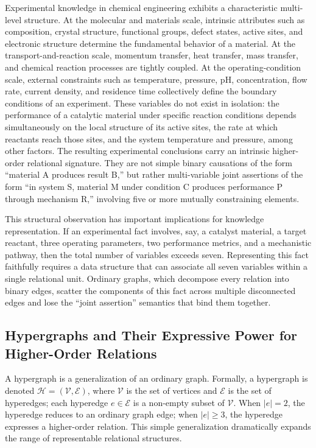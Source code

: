 \documentclass[11pt,a4paper]{article}
\begin{document}
Experimental knowledge in chemical engineering exhibits a characteristic multi-level structure. At the molecular and materials scale, intrinsic attributes such as composition, crystal structure, functional groups, defect states, active sites, and electronic structure determine the fundamental behavior of a material. At the transport-and-reaction scale, momentum transfer, heat transfer, mass transfer, and chemical reaction processes are tightly coupled. At the operating-condition scale, external constraints such as temperature, pressure, pH, concentration, flow rate, current density, and residence time collectively define the boundary conditions of an experiment. These variables do not exist in isolation: the performance of a catalytic material under specific reaction conditions depends simultaneously on the local structure of its active sites, the rate at which reactants reach those sites, and the system temperature and pressure, among other factors. The resulting experimental conclusions carry an intrinsic higher-order relational signature. They are not simple binary causations of the form ``material A produces result B,'' but rather multi-variable joint assertions of the form ``in system S, material M under condition C produces performance P through mechanism R,'' involving five or more mutually constraining elements.

This structural observation has important implications for knowledge representation. If an experimental fact involves, say, a catalyst material, a target reactant, three operating parameters, two performance metrics, and a mechanistic pathway, then the total number of variables exceeds seven. Representing this fact faithfully requires a data structure that can associate all seven variables within a single relational unit. Ordinary graphs, which decompose every relation into binary edges, scatter the components of this fact across multiple disconnected edges and lose the ``joint assertion'' semantics that bind them together.

\subsection{Hypergraphs and Their Expressive Power for Higher-Order Relations}
\label{subsec:hypergraph}

A hypergraph is a generalization of an ordinary graph. Formally, a hypergraph is denoted $\mathcal{H} = (\mathcal{V}, \mathcal{E})$, where $\mathcal{V}$ is the set of vertices and $\mathcal{E}$ is the set of hyperedges; each hyperedge $e \in \mathcal{E}$ is a non-empty subset of $\mathcal{V}$. When $|e| = 2$, the hyperedge reduces to an ordinary graph edge; when $|e| \geq 3$, the hyperedge expresses a higher-order relation. This simple generalization dramatically expands the range of representable relational structures.
\end{document}
